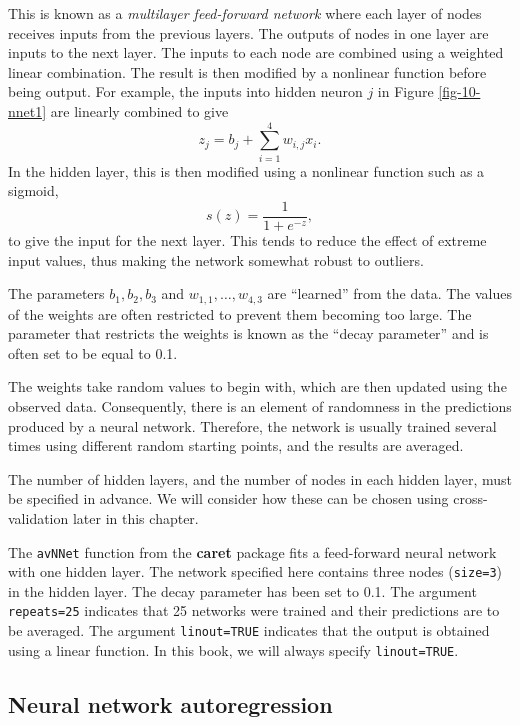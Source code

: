 \documentclass[]{book}
\begin{document}
This is known as a \emph{multilayer feed-forward network} where each layer of nodes receives inputs from the previous layers. The outputs of nodes in one layer are inputs to the next layer. The inputs to each node are combined using a weighted linear combination. The result is then modified by a nonlinear function before being output. For example, the inputs into hidden neuron \(j\) in Figure \ref{fig-10-nnet1} are linearly combined to give
\[
  z_j = b_j + \sum_{i=1}^4 w_{i,j} x_i.
\]
In the hidden layer, this is then modified using a nonlinear function such as a sigmoid,
\[
  s(z) = \frac{1}{1+e^{-z}},
\]
to give the input for the next layer. This tends to reduce the effect of extreme input values, thus making the network somewhat robust to outliers.

The parameters \(b_1,b_2,b_3\) and \(w_{1,1},\dots,w_{4,3}\) are ``learned'' from the data. The values of the weights are often restricted to prevent them becoming too large. The parameter that restricts the weights is known as the ``decay parameter'' and is often set to be equal to 0.1.

The weights take random values to begin with, which are then updated using the observed data. Consequently, there is an element of randomness in the predictions produced by a neural network. Therefore, the network is usually trained several times using different random starting points, and the results are averaged.

The number of hidden layers, and the number of nodes in each hidden layer, must be specified in advance. We will consider how these can be chosen using cross-validation later in this chapter.

The \texttt{avNNet} function from the \textbf{caret} package fits a feed-forward neural network with one hidden layer. The network specified here contains three nodes (\texttt{size=3}) in the hidden layer. The decay parameter has been set to 0.1. The argument \texttt{repeats=25} indicates that 25 networks were trained and their predictions are to be averaged. The argument \texttt{linout=TRUE} indicates that the output is obtained using a linear function. In this book, we will always specify \texttt{linout=TRUE}.

\hypertarget{neural-network-autoregression}{%
\subsection*{Neural network autoregression}\label{neural-network-autoregression}}
\end{document}
